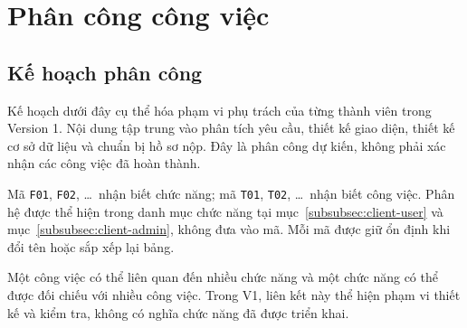 \section{Phân công công việc}

\subsection{Kế hoạch phân công}
\label{subsec:ke-hoach-phan-cong}

Kế hoạch dưới đây cụ thể hóa phạm vi phụ trách của từng thành viên trong
Version 1. Nội dung tập trung vào phân tích yêu cầu, thiết kế giao diện,
thiết kế cơ sở dữ liệu và chuẩn bị hồ sơ nộp. Đây là phân công dự kiến,
không phải xác nhận các công việc đã hoàn thành.

Mã \texttt{F01}, \texttt{F02}, \ldots\ nhận biết chức năng; mã \texttt{T01},
\texttt{T02}, \ldots\ nhận biết công việc. Phân hệ được thể hiện trong danh mục
chức năng tại mục~\ref{subsubsec:client-user} và
mục~\ref{subsubsec:client-admin}, không đưa vào mã.
Mỗi mã được giữ ổn định khi đổi tên hoặc sắp xếp lại bảng.

Một công việc có thể liên quan đến nhiều chức năng và một chức năng có thể
được đối chiếu với nhiều công việc. Trong V1, liên kết này thể hiện phạm vi
thiết kế và kiểm tra, không có nghĩa chức năng đã được triển khai.

